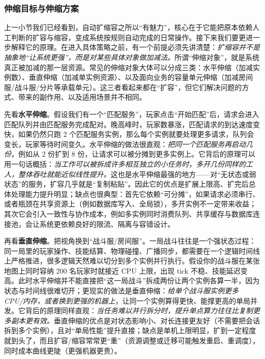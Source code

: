 \subsubsection{伸缩目标与伸缩方案}
上一小节我们已经看到，自动扩缩容之所以“有魅力”，核心在于它能把原本依赖人工判断的扩容与缩容，变成系统按规则自动完成的日常操作。接下来我们要更进一步解释它的原理。在进入具体策略之前，有一个前提必须先讲清楚：\emph{扩缩容并不是抽象地“让系统更强”，而是对某些具体对象做加减法。}所谓“伸缩对象”，就是系统真正被加减的那一层资源。常见的伸缩对象大体可以分成三类：水平伸缩（加减实例数）、垂直伸缩（加减单实例资源）、以及面向业务的容量单元伸缩（加减房间服/战斗服/分片等承载单元）。这三者看起来都在“扩容”，但它们解决问题的方式、带来的副作用、以及适用场景并不相同。

先看\textbf{水平伸缩}。假设我们有一个“匹配服务”，玩家点击“开始匹配”后，请求会进入匹配队列并由匹配服务完成配对。晚高峰时，玩家数暴涨，匹配请求的到达速度变快，如果仍然只跑 2 个匹配服务实例，那么每个实例就要处理更多请求，队列会变长，玩家等待时间变久。水平伸缩的做法很直观：\emph{把同一个匹配服务再启动几份}，例如从 2 份扩到 8 份，让请求可以被分摊到更多实例上。它背后的原理可以用一句话概括：\emph{当工作可以被拆成许多相互独立的小任务时，多开几份同样的工人，整体吞吐就能近似线性提升。}这也是水平伸缩最强的地方——对“无状态或弱状态”的服务，扩容几乎就是“复制粘贴”。因此它的优点是扩展上限高、扩完后总体处理能力提升明显；缺点也很典型：首先它依赖“可分摊”，如果请求必须串行、或者瓶颈在共享资源上（例如数据库写入、全局锁），多开实例不一定带来收益；其次它会引入一致性与协作成本，例如多实例同时消费队列、共享缓存与数据库连接池，会让系统更依赖良好的限流、隔离与容错设计。

再看\textbf{垂直伸缩}。把视角换到“战斗服/房间服”。一局战斗往往是一个强状态过程：同一局里的玩家操作、技能结算、物理碰撞、广播同步，都需要在一个逻辑时间线上严格推进，很多逻辑天然难以切分到多个实例并行执行。假设你的战斗服在某张地图上同时容纳 200 名玩家时就接近 CPU 上限，出现 tick 不稳、技能延迟变高。此时水平伸缩并不能直接把“这一局战斗”拆成两份让两个实例各算一半，因为状态与时间线很难切开；更现实的做法是垂直伸缩：\emph{给单个战斗服实例更多 CPU/内存，或者换到更强的机器上}，让同一个实例算得更快、能撑更高的单局并发。它背后的原理同样直观：\emph{当任务难以并行拆分时，提升单点算力往往比复制更多副本更有效。}垂直伸缩的优点是对状态影响小、对长连接更友好（不需要把会话拆到多个实例），且对“单局性能”提升直接；缺点是单机上限明显，扩到一定程度就到头了，而且扩容/缩容常常更“重”（资源调整或迁移可能触发重启、重调度），同时成本曲线更陡（更强机器更贵）。

